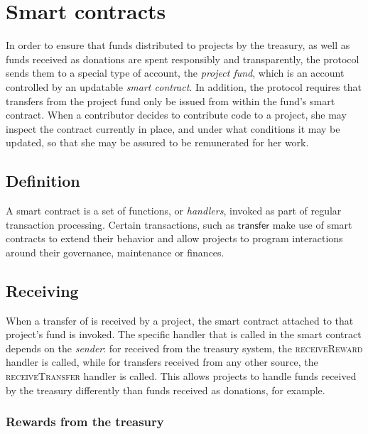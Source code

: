\section{Smart contracts}
\label{s:smart-contracts}

\newcommand{\handler}[1]{\textsc{\small#1}}

In order to ensure that funds distributed to projects by the \oscoin{}
treasury, as well as funds received as donations are spent responsibly and
transparently, the protocol sends them to a special type of account, the
\emph{project fund}, which is an account controlled by an updatable \emph{smart
contract}.
In addition, the protocol requires that transfers from the project fund only be
issued from within the fund's smart contract. When a contributor decides to
contribute code to a project, she may inspect the contract currently in place,
and under what conditions it may be updated, so that she may be assured to be
remunerated for her work.

\subsection{Definition}
A smart contract is a set of functions, or \emph{handlers}, invoked as part
of regular transaction processing. Certain transactions, such as $\mathsf{transfer}$
make use of smart contracts to extend their behavior and allow projects to
program interactions around their governance, maintenance or finances.

\subsection{Receiving \oscoin{}}

When a transfer of \oscoin{} is received by a project, the smart contract
attached to that project's fund is invoked. The specific handler that is
called in the smart contract depends on the \emph{sender}: for \oscoin{} received
from the treasury system, the \handler{receiveReward} handler is called, while
for transfers received from any other source, the \handler{receiveTransfer}
handler is called. This allows projects to handle funds received by the treasury
differently than funds received as donations, for example.

\subsubsection{Rewards from the treasury}

